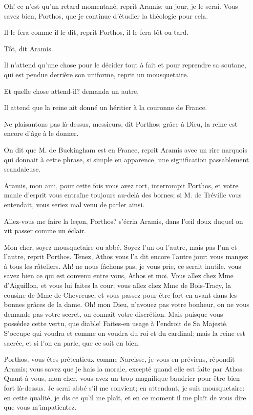 \speak  Oh! ce n'est qu'un retard momentané, reprit Aramis; un jour, je le serai. Vous savez bien, Porthos, que je continue d'étudier la théologie pour cela. 

\speak  Il le fera comme il le dit, reprit Porthos, il le fera tôt ou tard. 

\speak  Tôt, dit Aramis. 

\speak  Il n'attend qu'une chose pour le décider tout à fait et pour reprendre sa soutane, qui est pendue derrière son uniforme, reprit un mousquetaire. 

\speak  Et quelle chose attend-il? demanda un autre. 

\speak  Il attend que la reine ait donné un héritier à la couronne de France. 

\speak  Ne plaisantons pas là-dessus, messieurs, dit Porthos; grâce à Dieu, la reine est encore d'âge à le donner. 

\speak  On dit que M. de Buckingham est en France, reprit Aramis avec un rire narquois qui donnait à cette phrase, si simple en apparence, une signification passablement scandaleuse. 

\speak  Aramis, mon ami, pour cette fois vous avez tort, interrompit Porthos, et votre manie d'esprit vous entraîne toujours au-delà des bornes; si M. de Tréville vous entendait, vous seriez mal venu de parler ainsi. 

\speak  Allez-vous me faire la leçon, Porthos? s'écria Aramis, dans l'œil doux duquel on vit passer comme un éclair. 

\speak  Mon cher, soyez mousquetaire ou abbé. Soyez l'un ou l'autre, mais pas l'un et l'autre, reprit Porthos. Tenez, Athos vous l'a dit encore l'autre jour: vous mangez à tous les râteliers. Ah! ne nous fâchons pas, je vous prie, ce serait inutile, vous savez bien ce qui est convenu entre vous, Athos et moi. Vous allez chez Mme d'Aiguillon, et vous lui faites la cour; vous allez chez Mme de Bois-Tracy, la cousine de Mme de Chevreuse, et vous passez pour être fort en avant dans les bonnes grâces de la dame. Oh! mon Dieu, n'avouez pas votre bonheur, on ne vous demande pas votre secret, on connaît votre discrétion. Mais puisque vous possédez cette vertu, que diable! Faites-en usage à l'endroit de Sa Majesté. S'occupe qui voudra et comme on voudra du roi et du cardinal; mais la reine est sacrée, et si l'on en parle, que ce soit en bien. 

\speak  Porthos, vous êtes prétentieux comme Narcisse, je vous en préviens, répondit Aramis; vous savez que je hais la morale, excepté quand elle est faite par Athos. Quant à vous, mon cher, vous avez un trop magnifique baudrier pour être bien fort là-dessus. Je serai abbé s'il me convient; en attendant, je suis mousquetaire: en cette qualité, je dis ce qu'il me plaît, et en ce moment il me plaît de vous dire que vous m'impatientez. 

